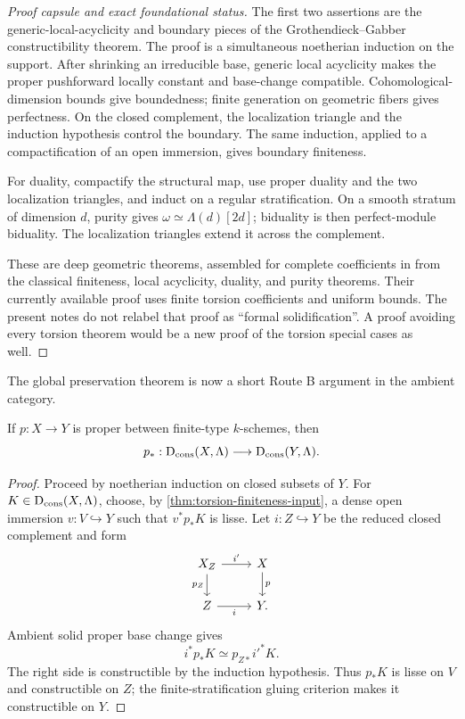 \begin{proof}[Proof capsule and exact foundational status]
The first two assertions are the generic-local-acyclicity and boundary
pieces of the Grothendieck--Gabber constructibility theorem.  The proof is a
simultaneous noetherian induction on the support.  After shrinking an
irreducible base, generic local acyclicity makes the proper pushforward
locally constant and base-change compatible.  Cohomological-dimension bounds
give boundedness; finite generation on geometric fibers gives perfectness.
On the closed complement, the localization triangle and the induction
hypothesis control the boundary.  The same induction, applied to a
compactification of an open immersion, gives boundary finiteness.

For duality, compactify the structural map, use proper duality and the two
localization triangles, and induct on a regular stratification.  On a smooth
stratum of dimension \(d\), purity gives
\(\omega\simeq\Lambda(d)[2d]\); biduality is then perfect-module biduality.
The localization triangles extend it across the complement.

These are deep geometric theorems, assembled for complete coefficients in
\cite[Section~6.7]{BhattScholzeProEtale} from the classical finiteness,
local acyclicity, duality, and purity theorems.  Their currently available
proof uses finite torsion coefficients and uniform bounds.  The present notes
do not relabel that proof as ``formal solidification''.  A proof avoiding
every torsion theorem would be a new proof of the torsion special cases as
well.
\end{proof}

The global preservation theorem is now a short Route B argument in the
ambient category.

\begin{proposition}
\label{prop:route-b-proper-constructible}
If \(p:X\to Y\) is proper between finite-type \(k\)-schemes, then
\[
 p_*:\mathrm D_{\mathrm{cons}}(X,\Lambda)\longrightarrow\mathrm D_{\mathrm{cons}}(Y,\Lambda).
\]
\end{proposition}

\begin{proof}
Proceed by noetherian induction on closed subsets of \(Y\).  For
\(K\in\mathrm D_{\mathrm{cons}}(X,\Lambda)\), choose, by
\cref{thm:torsion-finiteness-input}, a dense open immersion
\(v:V\hookrightarrow Y\) such that \(v^*p_*K\) is lisse.  Let
\(i:Z\hookrightarrow Y\) be the reduced closed complement and form
\[
\begin{tikzcd}
X_Z \arrow[r,"i'"] \arrow[d,"p_Z"'] & X \arrow[d,"p"] \\
Z \arrow[r,"i"'] & Y.
\end{tikzcd}
\]
Ambient solid proper base change gives
\[
 i^*p_*K\simeq p_{Z*}i'^*K.
\]
The right side is constructible by the induction hypothesis.  Thus \(p_*K\)
is lisse on \(V\) and constructible on \(Z\); the finite-stratification
gluing criterion makes it constructible on \(Y\).
\end{proof}

